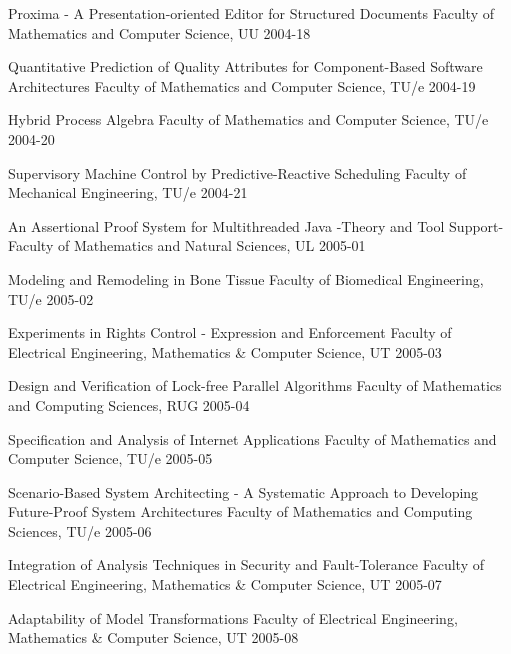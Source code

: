 \begin{multicols}{2}
     {Proxima - A Presentation-oriented Editor for Structured Documents}
     {Faculty of Mathematics and Computer Science, UU}
     {2004-18}

     {Quantitative Prediction of Quality Attributes for Component-Based Software Architectures}
         {Faculty of Mathematics and Computer Science, TU/e}
         {2004-19}

     {Hybrid Process Algebra}
         {Faculty of Mathematics and Computer Science, TU/e}
         {2004-20}

     {Supervisory Machine Control by Predictive-Reactive Scheduling}
         {Faculty of Mechanical Engineering, TU/e}
         {2004-21}

     {An Assertional Proof System for Multithreaded Java -Theory and Tool Support- }
         {Faculty of Mathematics and Natural Sciences, UL}
         {2005-01}

     {Modeling and Remodeling in Bone Tissue}
         {Faculty of Biomedical Engineering, TU/e}
         {2005-02}

     {Experiments in Rights Control - Expression and Enforcement}
         {Faculty of Electrical Engineering, Mathematics \& Computer Science, UT}
         {2005-03}

         {Design and Verification of Lock-free Parallel Algorithms}
         {Faculty of Mathematics and Computing Sciences, RUG}
         {2005-04}

     {Specification and Analysis of Internet Applications}
         {Faculty of Mathematics and Computer Science, TU/e}
         {2005-05}

         {Scenario-Based System Architecting - A Systematic Approach to Developing Future-Proof System Architectures}
         {Faculty of Mathematics and Computing Sciences, TU/e}
         {2005-06}

        {Integration of Analysis Techniques in Security and Fault-Tolerance}
        {Faculty of Electrical Engineering, Mathematics \& Computer Science, UT}
        {2005-07}

        {Adaptability of Model Transformations}
        {Faculty of Electrical Engineering, Mathematics \& Computer Science, UT}
        {2005-08}


\end{multicols}

